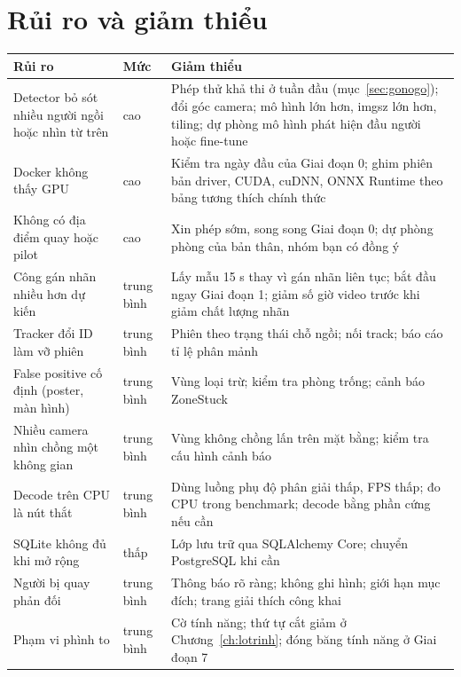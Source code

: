 \documentclass[10pt,a4paper,oneside,openany]{report}
\newcommand{\breakus}{\textunderscore\allowbreak}
\newcommand{\code}[1]{{\ttfamily\let\_\breakus #1}}
\newcommand{\tabhead}[1]{\textsf{\bfseries\color{ink}#1}}
\newenvironment{bang}{\par\small\rowcolors{2}{rowgray}{white}}{\par\vspace{0.3em}}
\begin{document}
\chapter{Rủi ro và giảm thiểu}\label{ch:ruiro}
\begin{bang}
\begin{xltabular}{\linewidth}{L{40mm}L{14mm}Y}
\toprule
\tabhead{Rủi ro} & \tabhead{Mức} & \tabhead{Giảm thiểu} \\
\midrule
\endhead
Detector bỏ sót nhiều người ngồi hoặc nhìn từ trên & cao & Phép thử khả thi ở tuần đầu (mục~\ref{sec:gonogo}); đổi góc camera; mô hình lớn hơn, \code{imgsz} lớn hơn, tiling; dự phòng mô hình phát hiện đầu người hoặc fine-tune \\
Docker không thấy GPU & cao & Kiểm tra ngày đầu của Giai đoạn 0; ghim phiên bản driver, CUDA, cuDNN, ONNX Runtime theo bảng tương thích chính thức \\
Không có địa điểm quay hoặc pilot & cao & Xin phép sớm, song song Giai đoạn 0; dự phòng phòng của bản thân, nhóm bạn có đồng ý \\
Công gán nhãn nhiều hơn dự kiến & trung bình & Lấy mẫu 15 s thay vì gán nhãn liên tục; bắt đầu ngay Giai đoạn 1; giảm số giờ video trước khi giảm chất lượng nhãn \\
Tracker đổi ID làm vỡ phiên & trung bình & Phiên theo trạng thái chỗ ngồi; nối track; báo cáo tỉ lệ phân mảnh \\
False positive cố định (poster, màn hình) & trung bình & Vùng loại trừ; kiểm tra phòng trống; cảnh báo \code{ZoneStuck} \\
Nhiều camera nhìn chồng một không gian & trung bình & Vùng không chồng lấn trên mặt bằng; kiểm tra cấu hình cảnh báo \\
Decode trên CPU là nút thắt & trung bình & Dùng luồng phụ độ phân giải thấp, FPS thấp; đo CPU trong benchmark; decode bằng phần cứng nếu cần \\
SQLite không đủ khi mở rộng & thấp & Lớp lưu trữ qua SQLAlchemy Core; chuyển PostgreSQL khi cần \\
Người bị quay phản đối & trung bình & Thông báo rõ ràng; không ghi hình; giới hạn mục đích; trang giải thích công khai \\
Phạm vi phình to & trung bình & Cờ tính năng; thứ tự cắt giảm ở Chương~\ref{ch:lotrinh}; đóng băng tính năng ở Giai đoạn 7 \\
\bottomrule
\end{xltabular}
\end{bang}
\end{document}
